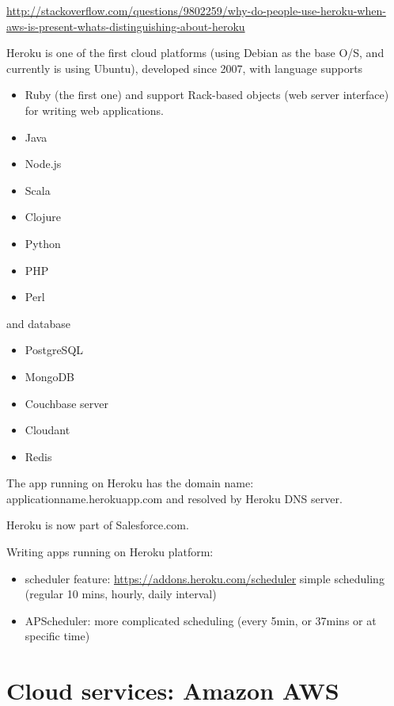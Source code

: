 \url{http://stackoverflow.com/questions/9802259/why-do-people-use-heroku-when-aws-is-present-whats-distinguishing-about-heroku}

Heroku is one of the first cloud platforms (using Debian as the base O/S, and currently is using
Ubuntu), developed since 2007, with language supports
\begin{itemize}
  \item Ruby (the first one) and support Rack-based objects (web server interface) for 
  writing web applications.
  
  \item Java
  \item Node.js
  \item Scala
  \item Clojure
  \item Python
  \item PHP
  \item Perl
\end{itemize}
and database
\begin{itemize}
  \item PostgreSQL
  \item MongoDB
  \item Couchbase server
  \item Cloudant
  \item Redis
\end{itemize}

The app running on Heroku has the domain name: applicationname.herokuapp.com
and resolved by Heroku DNS server.

Heroku is now part of Salesforce.com.


Writing apps running on Heroku platform:
\begin{itemize}
  \item scheduler feature: \url{https://addons.heroku.com/scheduler}
  simple scheduling (regular 10 mins, hourly, daily interval)
  
  \item APScheduler: more complicated scheduling (every 5min, or 37mins or
  at specific time)
\end{itemize}

\section{Cloud services: Amazon AWS}
\label{sec:Amazon_AWS}

